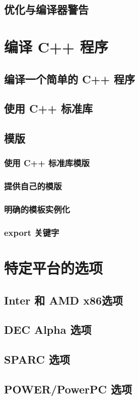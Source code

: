 \documentclass[lang=cn,12pt,newtx,scheme=chinese]{elegantbook}
\begin{document}
\section{优化与编译器警告}

\chapter{编译 C++ 程序}
\section{编译一个简单的 C++ 程序}
\section{使用 C++ 标准库}
\section{模版}
\subsection{使用 C++ 标准库模版}
\subsection{提供自己的模版}
\subsection{明确的模板实例化}
\subsection{export 关键字}

\chapter{特定平台的选项}
\section{Inter 和 AMD x86选项}
\section{DEC Alpha 选项}
\section{SPARC 选项}
\section{POWER/PowerPC 选项}
\end{document}
